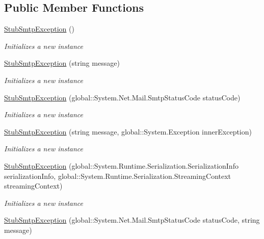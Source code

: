\subsection*{Public Member Functions}
\begin{DoxyCompactItemize}
\item 
\hyperlink{class_system_1_1_net_1_1_mail_1_1_fakes_1_1_stub_smtp_exception_a4abcc974bc19a89fae36fa8686292eaa}{Stub\-Smtp\-Exception} ()
\begin{DoxyCompactList}\small\item\em Initializes a new instance\end{DoxyCompactList}\item 
\hyperlink{class_system_1_1_net_1_1_mail_1_1_fakes_1_1_stub_smtp_exception_a1c7c2034bc34995311293ac6e71516c4}{Stub\-Smtp\-Exception} (string message)
\begin{DoxyCompactList}\small\item\em Initializes a new instance\end{DoxyCompactList}\item 
\hyperlink{class_system_1_1_net_1_1_mail_1_1_fakes_1_1_stub_smtp_exception_ab8c8fb063fdc309ca292d05694f130b1}{Stub\-Smtp\-Exception} (global\-::\-System.\-Net.\-Mail.\-Smtp\-Status\-Code status\-Code)
\begin{DoxyCompactList}\small\item\em Initializes a new instance\end{DoxyCompactList}\item 
\hyperlink{class_system_1_1_net_1_1_mail_1_1_fakes_1_1_stub_smtp_exception_aa5808a880b9dd43412ded4aab4b47b9c}{Stub\-Smtp\-Exception} (string message, global\-::\-System.\-Exception inner\-Exception)
\begin{DoxyCompactList}\small\item\em Initializes a new instance\end{DoxyCompactList}\item 
\hyperlink{class_system_1_1_net_1_1_mail_1_1_fakes_1_1_stub_smtp_exception_ab7f35c0b351471fdab995e026fc5221a}{Stub\-Smtp\-Exception} (global\-::\-System.\-Runtime.\-Serialization.\-Serialization\-Info serialization\-Info, global\-::\-System.\-Runtime.\-Serialization.\-Streaming\-Context streaming\-Context)
\begin{DoxyCompactList}\small\item\em Initializes a new instance\end{DoxyCompactList}\item 
\hyperlink{class_system_1_1_net_1_1_mail_1_1_fakes_1_1_stub_smtp_exception_afa95fb996a074843bf0fa2499b2b5768}{Stub\-Smtp\-Exception} (global\-::\-System.\-Net.\-Mail.\-Smtp\-Status\-Code status\-Code, string message)

\end{DoxyCompactItemize}
